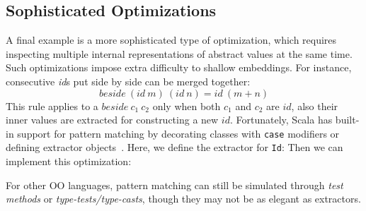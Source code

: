 \subsection{Sophisticated Optimizations}
A final example is a more sophisticated type of optimization, 
which requires inspecting multiple internal
representations of abstract values at the same time.
Such optimizations impose extra difficulty to shallow
embeddings.
For instance, consecutive \emph{id}s put side by side can be merged together:
$$
beside\ (id\ m)\ (id\ n) = id\ (m + n)
$$
This rule applies to a $beside\ c_1\ c_2$ only when both $c_1$ and $c_2$ are
$id$, also their inner values are extracted for constructing a new $id$.
Fortunately, Scala has built-in support for pattern matching by decorating
classes with \lstinline{case} modifiers or defining extractor objects~\cite{emir2007matching}.
Here, we define the extractor for \lstinline{Id}:
Then we can implement this optimization:

For other OO languages, pattern matching can still be simulated through \emph{test methods} or \emph{type-tests/type-casts},
though they may not be as elegant as extractors.


